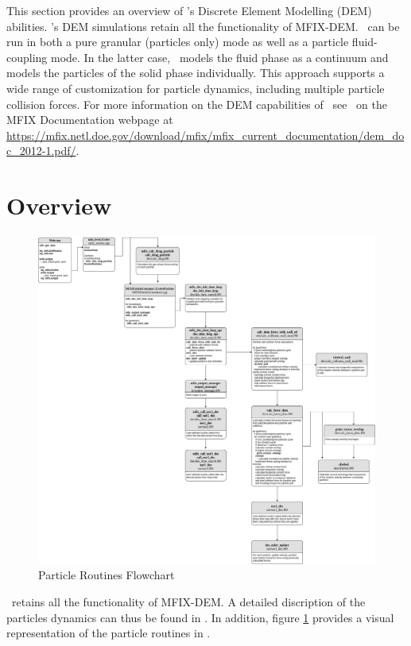 This section provides an overview of \mfix's Discrete Element Modelling (DEM)
abilities. \mfix's DEM simulations retain all the functionality of MFIX-DEM.
\mfix\ can be run in both a pure granular (particles only) mode
as well as a particle fluid-coupling mode. In the latter case, \mfix\ models
the fluid phase as a continuum and models the
particles of the solid phase individually. This approach supports a wide range
of customization for particle dynamics, including multiple particle collision
forces. For more information on the DEM capabilities of \mfix\
see \demdoc\ on the MFIX Documentation webpage at
{\url{https://mfix.netl.doe.gov/download/mfix/mfix_current_documentation/dem_doc_2012-1.pdf/}}.

\section{Overview}

\begin{figure}
    \includegraphics[width=\linewidth,natwidth=800, natheight=600]{./Particles/MFIX-Particle-Diagram.png}
    \caption{Particle Routines Flowchart}
    \label{fig:pflowchart}
\end{figure}

\mfix\ retains all the functionality of MFIX-DEM. A detailed discription of the
particles dynamics can thus be found in \demdoc.
In addition, figure \ref{fig:pflowchart} provides a visual representation
of the particle routines in \mfix.

